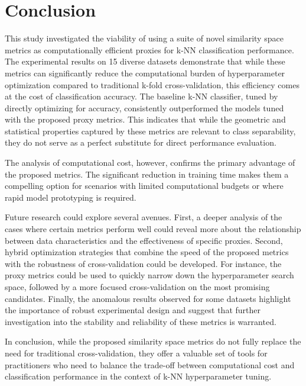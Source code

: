 \documentclass[conference]{IEEEtran}
\begin{document}
\section{Conclusion}
This study investigated the viability of using a suite of novel similarity space metrics as computationally efficient proxies for k-NN classification performance. The experimental results on 15 diverse datasets demonstrate that while these metrics can significantly reduce the computational burden of hyperparameter optimization compared to traditional k-fold cross-validation, this efficiency comes at the cost of classification accuracy. The baseline k-NN classifier, tuned by directly optimizing for accuracy, consistently outperformed the models tuned with the proposed proxy metrics. This indicates that while the geometric and statistical properties captured by these metrics are relevant to class separability, they do not serve as a perfect substitute for direct performance evaluation.

The analysis of computational cost, however, confirms the primary advantage of the proposed metrics. The significant reduction in training time makes them a compelling option for scenarios with limited computational budgets or where rapid model prototyping is required.

Future research could explore several avenues. First, a deeper analysis of the cases where certain metrics perform well could reveal more about the relationship between data characteristics and the effectiveness of specific proxies. Second, hybrid optimization strategies that combine the speed of the proposed metrics with the robustness of cross-validation could be developed. For instance, the proxy metrics could be used to quickly narrow down the hyperparameter search space, followed by a more focused cross-validation on the most promising candidates. Finally, the anomalous results observed for some datasets highlight the importance of robust experimental design and suggest that further investigation into the stability and reliability of these metrics is warranted.

In conclusion, while the proposed similarity space metrics do not fully replace the need for traditional cross-validation, they offer a valuable set of tools for practitioners who need to balance the trade-off between computational cost and classification performance in the context of k-NN hyperparameter tuning.
\end{document}
